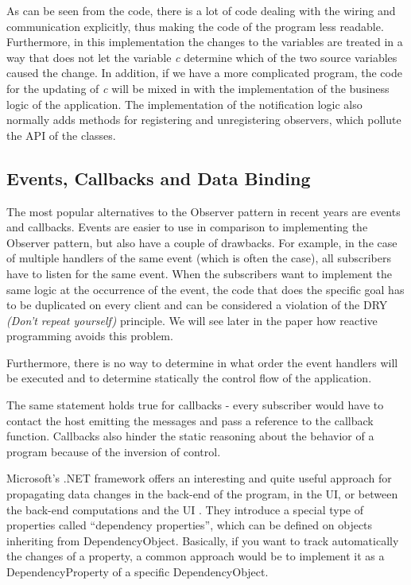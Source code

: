 \documentclass{sigplanconf}
\begin{document}
As can be seen from the code, there is a lot of code dealing with the wiring and communication explicitly, thus making the code of the program less readable. Furthermore, in this implementation the changes to the variables are treated in a way that does not let the variable \textit{c} determine which of the two source variables caused the change. In addition, if we have a more complicated program, the code for the updating of \textit{c} will be mixed in with the implementation of the business logic of the application. The implementation of the notification logic also normally adds methods for registering and unregistering observers, which pollute the API of the classes.

\subsection{Events, Callbacks and Data Binding}

The most popular alternatives to the Observer pattern in recent years are events and callbacks. 
Events are easier to use in comparison to implementing the Observer pattern, but also have a couple of drawbacks. For example, in the case of multiple handlers of the same event (which is often the case), all subscribers have to listen for the same event. When the subscribers want to implement the same logic at the occurrence of the event, the code that does the specific goal has to be duplicated on every client and can be considered a violation of the DRY \textit{(Don't repeat yourself)} principle. We will see later in the paper how reactive programming avoids this problem.

Furthermore, there is no way to determine in what order the event handlers will be executed and to determine statically the control flow of the application.

The same statement holds true for callbacks - every subscriber would have to contact the host emitting the messages and pass a reference to the callback function. Callbacks also hinder the static reasoning about the behavior of a program because of the inversion of control.

Microsoft's .NET framework \cite{net} offers an interesting and quite useful approach for propagating data changes in the back-end of the program, in the UI, or between the back-end computations and the UI \cite{dp}. They introduce a special type of properties called ``dependency properties'', which can be defined on objects inheriting from DependencyObject. Basically, if you want to track automatically the changes of a property, a common approach would be to implement it as a DependencyProperty of a specific DependencyObject. 
\end{document}
